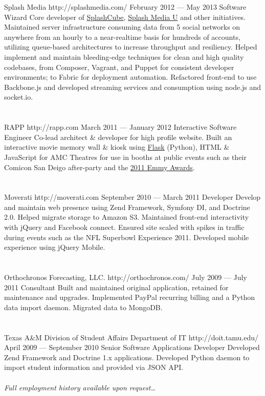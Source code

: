 \documentclass{resume}
\begin{document}
\employer
	{Splash Media}
	{http://splashmedia.com/}
	{February 2012 --- May 2013}
	{Software Wizard}
	{Core developer of \href{http://splashcube.com/}{SplashCube}, \href{http://splashmediau.com/}{Splash Media U} and other initiatives. Maintained server infrastructure consuming data from 5 social networks on anywhere from an hourly to a near-realtime basis for hundreds of accounts, utilizing queue-based architectures to increase throughput and resiliency. Helped implement and maintain bleeding-edge techniques for clean and high quality codebases, from Composer, Vagrant, and Puppet for consistent developer environments; to Fabric for deployment automation. Refactored front-end to use Backbone.js and developed streaming services and consumption using node.js and socket.io.}
\\ \\ \\
\employer
	{RAPP}
	{http://rapp.com}
	{March 2011 --- January 2012}
	{Interactive Software Engineer}
	{Co-lead architect \& developer for high profile website. Built an interactive movie memory wall \& kiosk using \href{http://flask.pocoo.org/}{Flask} (Python), HTML \& JavaScript for AMC Theatres for use in booths at public events such as their Comicon San Deigo after-party and the \href{http://www.accesshollywood.com/backstage-at-the-emmys/emmys-2011-backstage-at-the-hp-touchsmart-gift-lounge-day-1_gallerytab_3129/20}{2011 Emmy Awards}.}
\\ \\ \\
\employer
	{Moverati}
	{http://moverati.com}
	{September 2010 --- March 2011}
	{Developer}
	{Develop and maintain web presence using Zend Framework, Symfony DI, and Doctrine 2.0. Helped migrate storage to Amazon S3. Maintained front-end interactivity with jQuery and Facebook connect. Ensured site scaled with spikes in traffic during events such as the NFL Superbowl Experience 2011. Developed mobile experience using jQuery Mobile.}
\\ \\ \\
\employer
	{Orthochronos Forecasting, LLC.}
	{http://orthochronos.com/}
	{July 2009 --- July 2011}
	{Consultant}
	{Built and maintained original application, retained for maintenance and upgrades. Implemented PayPal recurring billing and a Python data import daemon. Migrated data to MongoDB.}
\\ \\ \\
\employer
	{Texas A\&M Division of Student Affairs Department of IT}
	{http://doit.tamu.edu/}
	{April 2009 --- September 2010}
	{Senior Software Applications Developer}
	{Developed Zend Framework and Doctrine 1.x applications. Developed Python daemon to import student information and provided via JSON API.}
\\ \\
\emph{Full employment history available upon request\ldots}
\end{document}
